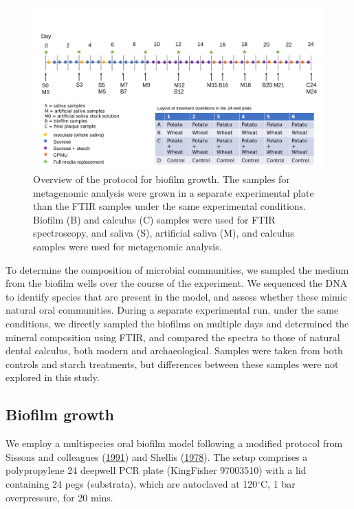 \documentclass[
  letterpaper,
]{book}
\begin{document}
\begin{figure}

{\centering \includegraphics{figures/Exp_protocol.png}

}

\caption{\label{fig-protocol}Overview of the protocol for biofilm
growth. The samples for metagenomic analysis were grown in a separate
experimental plate than the FTIR samples under the same experimental
conditions. Biofilm (B) and calculus (C) samples were used for FTIR
spectroscopy, and saliva (S), artificial saliva (M), and calculus
samples were used for metagenomic analysis.}

\end{figure}

To determine the composition of microbial communities, we sampled the
medium from the biofilm wells over the course of the experiment. We
sequenced the DNA to identify species that are present in the model, and
assess whether these mimic natural oral communities. During a separate
experimental run, under the same conditions, we directly sampled the
biofilms on multiple days and determined the mineral composition using
FTIR, and compared the spectra to those of natural dental calculus, both
modern and archaeological. Samples were taken from both controls and
starch treatments, but differences between these samples were not
explored in this study.

\hypertarget{biofilm-growth}{%
\subsection{Biofilm growth}\label{biofilm-growth}}

We employ a multispecies oral biofilm model following a modified
protocol from Sissons and colleagues
(\protect\hyperlink{ref-sissonsMultistationPlaque1991}{1991}) and
Shellis (\protect\hyperlink{ref-shellisSyntheticSaliva1978}{1978}). The
setup comprises a polypropylene 24 deepwell PCR plate (KingFisher
97003510) with a lid containing 24 pegs (substrata), which are
autoclaved at 120\(^{\circ}\)C, 1 bar overpressure, for 20 mins.
\end{document}
